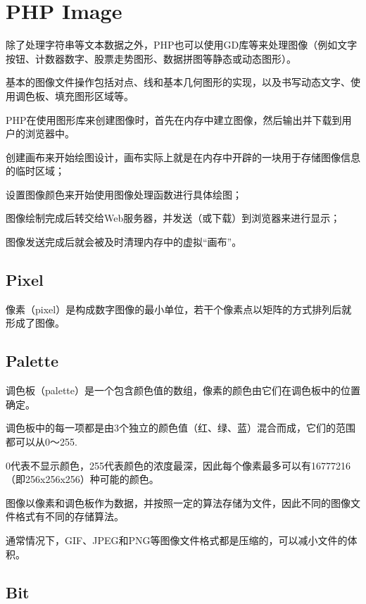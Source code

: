 \chapter{PHP Image}

除了处理字符串等文本数据之外，PHP也可以使用GD库等来处理图像（例如文字按钮、计数器数字、股票走势图形、数据拼图等静态或动态图形）。

基本的图像文件操作包括对点、线和基本几何图形的实现，以及书写动态文字、使用调色板、填充图形区域等。



PHP在使用图形库来创建图像时，首先在内存中建立图像，然后输出并下载到用户的浏览器中。

\begin{compactenum}
\item 创建画布来开始绘图设计，画布实际上就是在内存中开辟的一块用于存储图像信息的临时区域；
\item 设置图像颜色来开始使用图像处理函数进行具体绘图；
\item 图像绘制完成后转交给Web服务器，并发送（或下载）到浏览器来进行显示；
\item 图像发送完成后就会被及时清理内存中的虚拟“画布”。
\end{compactenum}


\section{Pixel}


像素（pixel）是构成数字图像的最小单位，若干个像素点以矩阵的方式排列后就形成了图像。

\section{Palette}

调色板（palette）是一个包含颜色值的数组，像素的颜色由它们在调色板中的位置确定。

调色板中的每一项都是由3个独立的颜色值（红、绿、蓝）混合而成，它们的范围都可以从0～255.

0代表不显示颜色，255代表颜色的浓度最深，因此每个像素最多可以有16777216（即256x256x256）种可能的颜色。

图像以像素和调色板作为数据，并按照一定的算法存储为文件，因此不同的图像文件格式有不同的存储算法。

通常情况下，GIF、JPEG和PNG等图像文件格式都是压缩的，可以减小文件的体积。

\section{Bit}

